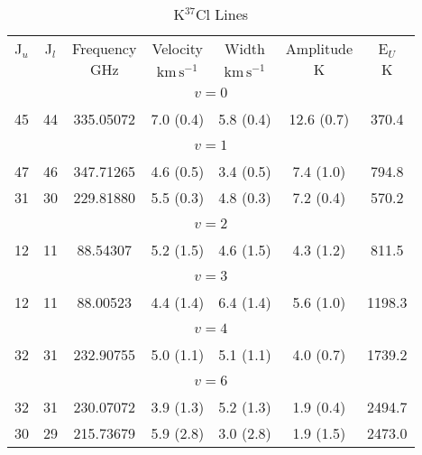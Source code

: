 \begin{table*}[htp]
\centering
\caption{K$^{37}$Cl Lines}
\begin{tabular}{ccccccc}
\label{tab:K37Cl_salt_lines}
 J$_u$ & J$_l$ & Frequency & Velocity & Width & Amplitude & E$_U$ \\
  &  & $\mathrm{GHz}$ & $\mathrm{km\,s^{-1}}$ & $\mathrm{km\,s^{-1}}$ & $\mathrm{K}$ & $\mathrm{K}$ \\
\hline
&\vspace{-0.75em}\\
\multicolumn{7}{c}{$v = 0$} \\
\vspace{-0.75em}\\
 45 & 44 & 335.05072 & 7.0 (0.4) & 5.8 (0.4) & 12.6 (0.7) & 370.4 \\
&\vspace{-0.75em}\\
\multicolumn{7}{c}{$v = 1$} \\
\vspace{-0.75em}\\
 47 & 46 & 347.71265 & 4.6 (0.5) & 3.4 (0.5) & 7.4 (1.0) & 794.8 \\
 31 & 30 & 229.81880 & 5.5 (0.3) & 4.8 (0.3) & 7.2 (0.4) & 570.2 \\
&\vspace{-0.75em}\\
\multicolumn{7}{c}{$v = 2$} \\
\vspace{-0.75em}\\
 12 & 11 & 88.54307 & 5.2 (1.5) & 4.6 (1.5) & 4.3 (1.2) & 811.5 \\
&\vspace{-0.75em}\\
\multicolumn{7}{c}{$v = 3$} \\
\vspace{-0.75em}\\
 12 & 11 & 88.00523 & 4.4 (1.4) & 6.4 (1.4) & 5.6 (1.0) & 1198.3 \\
&\vspace{-0.75em}\\
\multicolumn{7}{c}{$v = 4$} \\
\vspace{-0.75em}\\
 32 & 31 & 232.90755 & 5.0 (1.1) & 5.1 (1.1) & 4.0 (0.7) & 1739.2 \\
\hline
&\vspace{-0.75em}\\
\multicolumn{7}{c}{$v = 6$} \\
\vspace{-0.75em}\\
 32 & 31 & 230.07072 & 3.9 (1.3) & 5.2 (1.3) & 1.9 (0.4) & 2494.7 \\
 30 & 29 & 215.73679 & 5.9 (2.8) & 3.0 (2.8) & 1.9 (1.5) & 2473.0 \\
\end{tabular}

\par 
\end{table*}
